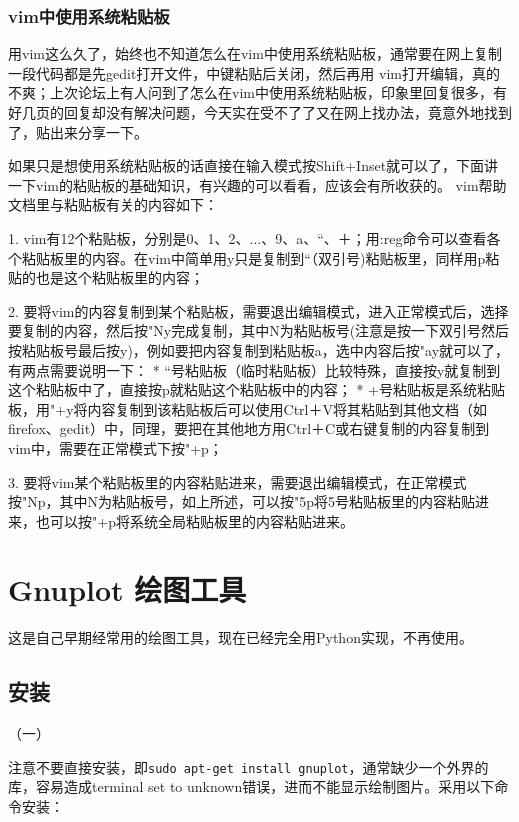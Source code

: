 \subsubsection{vim中使用系统粘贴板}
用vim这么久了，始终也不知道怎么在vim中使用系统粘贴板，通常要在网上复制一段代码都是先gedit打开文件，中键粘贴后关闭，然后再用 vim打开编辑，真的不爽；上次论坛上有人问到了怎么在vim中使用系统粘贴板，印象里回复很多，有好几页的回复却没有解决问题，今天实在受不了了又在网上找办法，竟意外地找到了，贴出来分享一下。 

如果只是想使用系统粘贴板的话直接在输入模式按Shift+Inset就可以了，下面讲一下vim的粘贴板的基础知识，有兴趣的可以看看，应该会有所收获的。 
vim帮助文档里与粘贴板有关的内容如下： 

1. vim有12个粘贴板，分别是0、1、2、...、9、a、“、＋；用:reg命令可以查看各个粘贴板里的内容。在vim中简单用y只是复制到“（双引号)粘贴板里，同样用p粘贴的也是这个粘贴板里的内容； 

2. 要将vim的内容复制到某个粘贴板，需要退出编辑模式，进入正常模式后，选择要复制的内容，然后按"Ny完成复制，其中N为粘贴板号(注意是按一下双引号然后按粘贴板号最后按y)，例如要把内容复制到粘贴板a，选中内容后按"ay就可以了，有两点需要说明一下： 
* “号粘贴板（临时粘贴板）比较特殊，直接按y就复制到这个粘贴板中了，直接按p就粘贴这个粘贴板中的内容； 
* +号粘贴板是系统粘贴板，用"+y将内容复制到该粘贴板后可以使用Ctrl＋V将其粘贴到其他文档（如firefox、gedit）中，同理，要把在其他地方用Ctrl＋C或右键复制的内容复制到vim中，需要在正常模式下按"+p； 

3. 要将vim某个粘贴板里的内容粘贴进来，需要退出编辑模式，在正常模式按"Np，其中N为粘贴板号，如上所述，可以按"5p将5号粘贴板里的内容粘贴进来，也可以按"+p将系统全局粘贴板里的内容粘贴进来。 






\section{Gnuplot 绘图工具}
这是自己早期经常用的绘图工具，现在已经完全用Python实现，不再使用。

\subsection{安装}
（一）

注意不要直接安装，即\verb*|sudo apt-get install gnuplot|，通常缺少一个外界的库，容易造成terminal set to unknown错误，进而不能显示绘制图片。采用以下命令安装：

